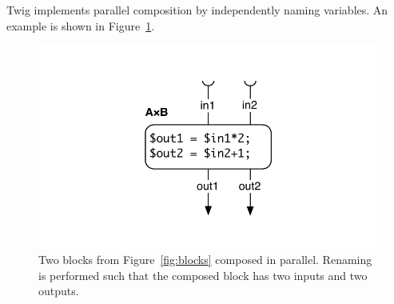 Twig implements parallel composition by independently naming variables. An example is shown in Figure~\ref{fig:codegen-par}.

\begin{figure}[ht]
\centering
\includegraphics[width=0.75\columnwidth]{images/code-gen3}
\caption{Two blocks from Figure~\ref{fig:blocks} composed in parallel. Renaming is performed such that the composed block has two inputs and two outputs.}
\label{fig:codegen-par}
\end{figure}

